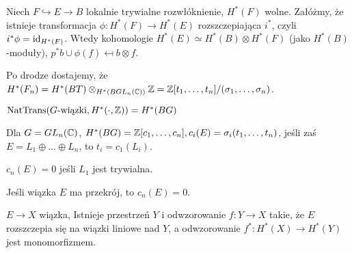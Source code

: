  \begin{twierdzenie}
  Niech $F \hookrightarrow E \to B$ lokalnie trywialne rozwłóknienie, $H^\ast(F)$ wolne.
  Załóżmy, że istnieje transformacja $\phi: H^\ast(F) \to H^\ast(E)$ rozszczepiająca $i^\ast$, czyli $i^\ast \phi = {\mathrm{id}}_{H^\ast(F)}$.
  Wtedy kohomologie $H^\ast(E) \simeq H^\ast(B) \otimes H^\ast(F)$ (jako $H^\ast(B)$-moduły), $p^\ast b \cup \phi(f) \mapsfrom b \otimes f$.
 \end{twierdzenie}
 
 \begin{uwaga}
  Po drodze dostajemy, że $H^\ast(F_n) = H^\ast(BT) \otimes_{H^\ast(BGL_n({\mathbb{C}}))} {\mathbb{Z}} = {\mathbb{Z}}[t_1, \ldots, t_n]/(\sigma_1, \ldots, \sigma_n)$.
 \end{uwaga}
 
 \begin{wniosek}
  ${\mathrm{NatTrans}}(G\text{-wiązki},H^\ast(\cdot, {\mathbb{Z}})) = H^\ast(BG)$
 \end{wniosek}
 
 \begin{wniosek}
  Dla $G=GL_n({\mathbb{C}})$, $H^\ast(BG)={\mathbb{Z}}[c_1, \ldots, c_n], c_i(E)=\sigma_i(t_1, \ldots, t_n)$, jeśli zaś $E=L_1 \oplus \ldots \oplus L_n$, to $t_i=c_1(L_i)$.
 \end{wniosek}
 
 \begin{wniosek}
  $c_n(E)=0$ jeśli $L_1$ jest trywialna.
 \end{wniosek}
 
 \begin{stwierdzenie}
  Jeśli wiązka $E$ ma przekrój, to $c_n(E)=0$.
 \end{stwierdzenie}
 
 \begin{stwierdzenie}
  $E \to X$ wiązka, Istnieje przestrzeń $Y$ i odwzorowanie $f:Y \to X$ takie, że $E$ rozszczepia się na wiązki liniowe nad $Y$, a odwzorowanie $f^\ast:H^\ast(X) \to H^\ast(Y)$ jest monomorfizmem.
 \end{stwierdzenie}
















 
 
 
